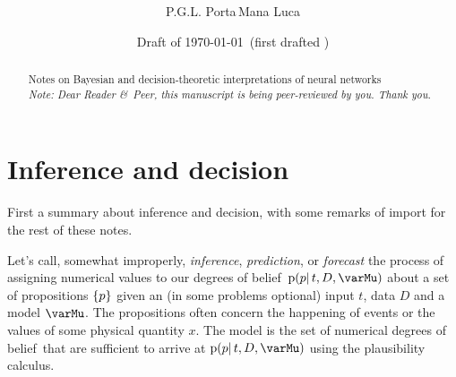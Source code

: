\documentclass[\ifafour a4paper,12pt,\else a5paper,10pt,\fi%
onecolumn,oneside,article,%
british%
]{memoir}
\title{\propertitle%
}
\author{\ifpublic%
P.G.L. Porta\,Mana%
\else Luca\fi
\\
{\footnotesize\epost{\email{piero.mana}{ntnu.no}}%
}}
\date{Draft of \today\ (first drafted \firstdraft)}
\theoremstyle{remark}
\theoremstyle{innote}
\newcommand*{\amp}{\&}
\newcommand*{\asudedication}[1]{%
{\par\centering\textit{#1}\par}}
\DeclarePairedDelimiter\set{\{}{\}}
\newcommand*{\pf}{\mathrm{p}}%
\renewcommand*{\|}{\mathpunct{|}}
\newcommand*{\dobs}{degrees of belief}
\newcommand*{\yp}{p}
\newcommand*{\yD}{D}
\newcommand*{\yM}{\varMu}
\begin{document}
\captiondelim{\quad}\captionnamefont{\footnotesize}\captiontitlefont{\footnotesize}
\frenchspacing

\maketitle
\abstractrunin
\abslabeldelim{}
\renewcommand*{\abstractname}{}
\setlength{\absleftindent}{0pt}
\setlength{\absrightindent}{0pt}
\setlength{\abstitleskip}{-\absparindent}
\begin{abstract}%
  \noindent Notes on Bayesian and decision-theoretic interpretations of
  neural networks
\ifpublic\\\noindent\emph{\footnotesize Note: Dear Reader \amp\ Peer, this
  manuscript is being peer-reviewed by you. Thank you.}\fi
\end{abstract}

\frenchspacing


\section{Inference and decision}
\label{sec:intro}

First a summary about inference and decision, with some remarks of import
for the rest of these notes.

Let's call, somewhat improperly, \emph{inference}, \emph{prediction}, or
\emph{forecast} the process of assigning numerical values to our \dobs\
$\pf(\yp \|t, \yD, \yM)$ about a set of propositions $\set{\yp}$ given an
(in some problems optional) input $t$, data $\yD$ and a model $\yM$. The
propositions often concern the happening of events or the values of some
physical quantity $x$. The model is the set of numerical \dobs\ that are
sufficient to arrive at $\pf(\yp \|t, \yD, \yM)$ using the plausibility
calculus.
\end{document}

